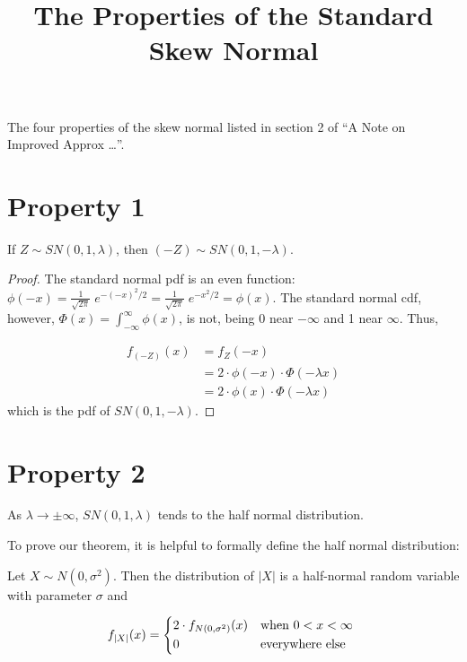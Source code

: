 \documentclass{article}
\numberwithin{equation}{section}
\begin{document}
\title{The Properties of the Standard Skew Normal}
\date{}
\maketitle

The four properties of the skew normal listed in section 2 of ``A Note on Improved Approx \ldots''.

\section{Property 1}
\begin{thm*}
  If $Z \sim SN(0, 1, \lambda)$, then $(-Z) \sim SN(0, 1, -\lambda)$.
\end{thm*}

\begin{proof}
  
  The standard normal pdf is an even function: $\phi(-x) = \frac{1}{\sqrt{2\pi}}\;e^{-(-x)^2/2} =
  \frac{1}{\sqrt{2\pi}}\;e^{-x^2/2} = \phi(x)$. The standard normal cdf, however, $\Phi(x) =
  \int_{-\infty}^\infty \phi(x)$, is not, being 0 near $-\infty$ and 1 near $\infty$. Thus,
  
  \begin{align*}
    f_{(-Z)}(x) &= f_Z(-x) \\
    & = 2 \cdot \phi(-x) \cdot \Phi (-\lambda x) \\
    & = 2 \cdot \phi(x) \cdot \Phi (-\lambda x)
  \end{align*}
  which is the pdf of $SN(0, 1, -\lambda)$.
\end{proof}

\section{Property 2}
\begin{thm*}
  As $\lambda \to \pm \infty$, $SN(0, 1, \lambda)$ tends to the half normal distribution.
\end{thm*}

To prove our theorem, it is helpful to formally define the half normal distribution:

\begin{lemma*}
  Let $X \sim N(0, \sigma^2)$. Then the distribution of $|X|$ is a half-normal random variable
  with parameter $\sigma$ and

  \[
  f_{|X|}(x) =
  \begin{dcases*}
    2 \cdot f_{N(0, \sigma^2)}(x) & when $0 < x < \infty$ \\
    0 & everywhere else
  \end{dcases*}
  \]
\end{lemma*}
\end{document}
